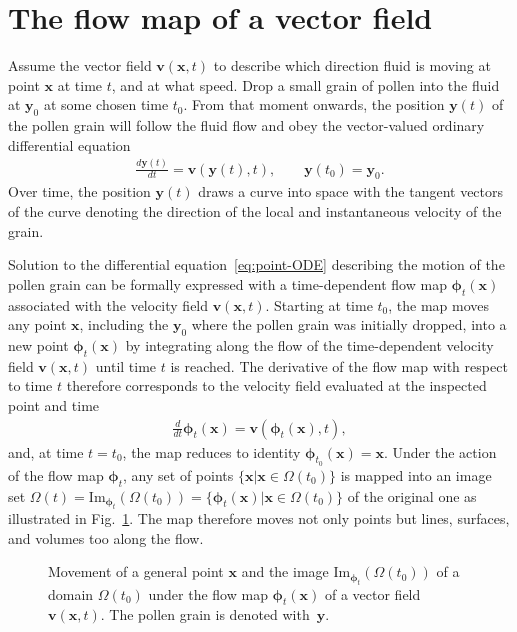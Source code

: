 \section{The flow map of a vector field}
Assume the vector field $\bm{v}(\bm{x},t)$ to describe which direction fluid is moving at point $\bm{x}$ at time $t$, and at what speed. Drop a small grain of pollen into the fluid at $\bm{y}_0$ at some chosen time $t_0$. From that moment onwards, the position $\bm{y}(t)$ of the pollen grain will follow the fluid flow and obey the vector-valued ordinary differential equation
\begin{align}\label{eq:point-ODE}
    \frac{d\bm{y}(t)}{dt}=\bm{v}(\bm{y}(t),t), \qquad \bm{y}(t_0)=\bm{y}_0.
\end{align}
Over time, the position $\bm{y}(t)$ draws a curve into space with the tangent vectors of the curve denoting the direction of the local and instantaneous velocity of the grain.
\begin{center}
    
\end{center}

Solution to the differential equation~\eqref{eq:point-ODE} describing the motion of the pollen grain can be formally expressed with a time-dependent flow map $\bm{\phi}_t(\bm{x})$ associated with the velocity field $\bm{v}(\bm{x},t)$. Starting at time $t_0$, the map moves any point $\bm{x}$, including the $\bm{y}_0$ where the pollen grain was initially dropped, into a new point $\bm{\phi}_t(\bm{x})$ by integrating along the flow of the time-dependent velocity field $\bm{v}(\bm{x},t)$ until time $t$ is reached. The derivative of the flow map with respect to time $t$ therefore corresponds to the velocity field evaluated at the inspected point and time
\begin{align}
    \frac{d}{dt}\bm{\phi}_t(\bm{x})=\bm{v}(\bm{\phi}_t(\bm{x}),t),
\end{align}
and, at time $t=t_0$, the map reduces to identity $\bm{\phi}_{t_0}(\bm{x})=\bm{x}$. Under the action of the flow map $\bm{\phi}_t$, any set of points $\{\bm{x}|\bm{x}\in\Omega(t_0)\}$ is mapped into an image set $\Omega(t)=\text{Im}_{\bm{\phi}_t}(\Omega(t_0))=\{\bm{\phi}_t(\bm{x})|\bm{x}\in\Omega(t_0)\}$ of the original one as illustrated in Fig.~\ref{fig:flowmap}. The map therefore moves not only points but lines, surfaces, and volumes too along the flow.
\begin{figure}[!htb]
    \centering
    
    \caption{Movement of a general point $\bm{x}$ and the image $\text{Im}_{\bm{\phi}_t}(\Omega(t_0))$ of a domain $\Omega(t_0)$ under the flow map $\bm{\phi}_t(\bm{x})$ of a vector field $\bm{v}(\bm{x},t)$. The pollen grain is denoted with~$\bm{y}$.}
    \label{fig:flowmap}
\end{figure}

